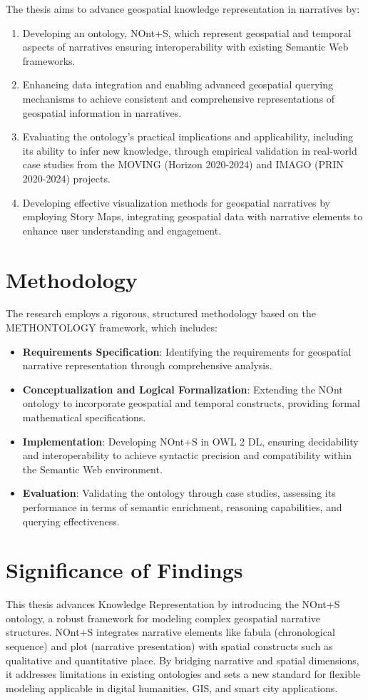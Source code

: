 The thesis aims to advance geospatial knowledge representation in narratives by:
\begin{enumerate}
    \item Developing an ontology, NOnt+S, which represent geospatial and temporal aspects of narratives ensuring interoperability with existing Semantic Web frameworks.
    \item Enhancing data integration and enabling advanced geospatial querying mechanisms to achieve consistent and comprehensive representations of geospatial information in narratives.
    \item Evaluating the ontology's practical implications and applicability, including its ability to infer new knowledge, through empirical validation in real-world case studies from the MOVING (Horizon 2020-2024) and IMAGO (PRIN 2020-2024) projects.
    \item Developing effective visualization methods for geospatial narratives by employing Story Maps, integrating geospatial data with narrative elements to enhance user understanding and engagement.
\end{enumerate}

\section*{Methodology}

The research employs a rigorous, structured methodology based on the METHONTOLOGY framework, which includes:
\begin{itemize}
    \item \textbf{Requirements Specification}: Identifying the requirements for geospatial narrative representation through comprehensive analysis.
    \item \textbf{Conceptualization and Logical Formalization}: Extending the NOnt ontology to incorporate geospatial and temporal constructs, providing formal mathematical specifications.
    \item \textbf{Implementation}: Developing NOnt+S in OWL 2 DL, ensuring decidability and interoperability to achieve syntactic precision and compatibility within the Semantic Web environment.
    \item \textbf{Evaluation}: Validating the ontology through case studies, assessing its performance in terms of semantic enrichment, reasoning capabilities, and querying effectiveness.
\end{itemize}

\section*{Significance of Findings}
This thesis advances Knowledge Representation by introducing the NOnt+S ontology, a robust framework for modeling complex geospatial narrative structures. NOnt+S integrates narrative elements like fabula (chronological sequence) and plot (narrative presentation) with spatial constructs such as qualitative and quantitative place. By bridging narrative and spatial dimensions, it addresses limitations in existing ontologies and sets a new standard for flexible modeling applicable in digital humanities, GIS, and smart city applications.

